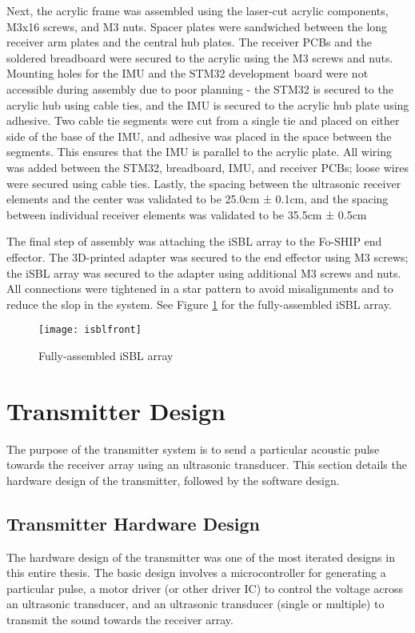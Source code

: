 \documentclass[12pt,a4paper]{report}
\begin{document}
Next, the acrylic frame was assembled using the laser-cut acrylic components, M3x16 screws, and M3 nuts. Spacer plates were sandwiched between the long receiver arm plates and the central hub plates. The receiver PCBs and the soldered breadboard were secured to the acrylic using the M3 screws and nuts. Mounting holes for the IMU and the STM32 development board were not accessible during assembly due to poor planning - the STM32 is secured to the acrylic hub using cable ties, and the IMU is secured to the acrylic hub plate using adhesive. Two cable tie segments were cut from a single tie and placed on either side of the base of the IMU, and adhesive was placed in the space between the segments. This ensures that the IMU is parallel to the acrylic plate. All wiring was added between the STM32, breadboard, IMU, and receiver PCBs; loose wires were secured using cable ties. Lastly, the spacing between the ultrasonic receiver elements and the center was validated to be 25.0cm ± 0.1cm, and the spacing between individual receiver elements was validated to be 35.5cm ± 0.5cm

The final step of assembly was attaching the iSBL array to the Fo-SHIP end effector. The 3D-printed adapter was secured to the end effector using M3 screws; the iSBL array was secured to the adapter using additional M3 screws and nuts. All connections were tightened in a star pattern to avoid misalignments and to reduce the slop in the system. See Figure \ref{fig:isblfront} for the fully-assembled iSBL array.

\begin{figure}[htbp]
	\centering
	\texttt{[image: isblfront]}
	\caption{Fully-assembled iSBL array}
	\label{fig:isblfront}
\end{figure}

\section{Transmitter Design} \label{sec:3s6}
The purpose of the transmitter system is to send a particular acoustic pulse towards the receiver array using an ultrasonic transducer. This section details the hardware design of the transmitter, followed by the software design.

\subsection{Transmitter Hardware Design} \label{ssec:3s6s1}
The hardware design of the transmitter was one of the most iterated designs in this entire thesis. The basic design involves a microcontroller for generating a particular pulse, a motor driver (or other driver IC) to control the voltage across an ultrasonic transducer, and an ultrasonic transducer (single or multiple) to transmit the sound towards the receiver array. 
\end{document}
